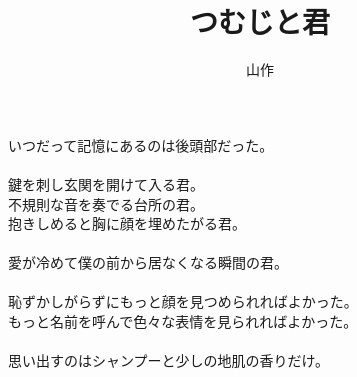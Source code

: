 \documentclass[a5j,12pt]{tbook}
\title{つむじと君}
\author{\rensuji{J}山\rensuji{B}作}
\date{}
\begin{document}
\maketitle

いつだって記憶にあるのは後頭部だった。\\
\\
鍵を刺し玄関を開けて入る君。\\
不規則な音を奏でる台所の君。\\
抱きしめると胸に顔を埋めたがる君。\\
\\
愛が冷めて僕の前から居なくなる瞬間の君。\\
\\
恥ずかしがらずにもっと顔を見つめられればよかった。\\
もっと名前を呼んで色々な表情を見られればよかった。\\
\\
思い出すのはシャンプーと少しの地肌の香りだけ。
\end{document}
